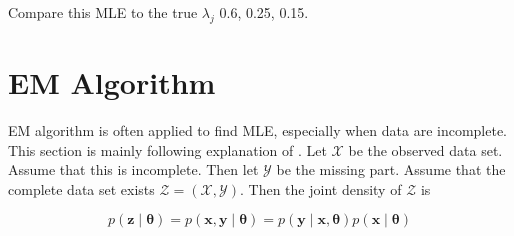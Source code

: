 \documentclass[]{book}
\newenvironment{Shaded}{\begin{snugshade}}{\end{snugshade}}
\newcommand{\CommentTok}[1]{\textcolor[rgb]{0.56,0.35,0.01}{\textit{#1}}}
\newcommand{\DataTypeTok}[1]{\textcolor[rgb]{0.13,0.29,0.53}{#1}}
\newcommand{\DecValTok}[1]{\textcolor[rgb]{0.00,0.00,0.81}{#1}}
\newcommand{\KeywordTok}[1]{\textcolor[rgb]{0.13,0.29,0.53}{\textbf{#1}}}
\newcommand{\NormalTok}[1]{#1}
\newcommand{\OperatorTok}[1]{\textcolor[rgb]{0.81,0.36,0.00}{\textbf{#1}}}
\newcommand{\StringTok}[1]{\textcolor[rgb]{0.31,0.60,0.02}{#1}}
\theoremstyle{definition}
\theoremstyle{definition}
\theoremstyle{definition}
\theoremstyle{remark}
\begin{document}
\begin{Shaded}
\end{Shaded}

Compare this MLE to the true \(\lambda_j\) 0.6, 0.25, 0.15.

\hypertarget{em-algorithm}{%
\section{EM Algorithm}\label{em-algorithm}}

EM algorithm is often applied to find MLE, especially when data are incomplete. This section is mainly following explanation of \citet{Bilmes:1998tg}. Let \(\mathcal{X}\) be the observed data set. Assume that this is incomplete. Then let \(\mathcal{Y}\) be the missing part. Assume that the complete data set exists \(\mathcal{Z} = (\mathcal{X}, \mathcal{Y})\). Then the joint density of \(\mathcal{Z}\) is

\begin{equation}
  p(\mathbf{z} \mid \boldsymbol\theta) = p(\mathbf{x}, \mathbf{y} \mid \boldsymbol\theta) = p(\mathbf{y} \mid \mathbf{x}, \boldsymbol\theta) p(\mathbf{x} \mid \boldsymbol\theta)
  \label{eq:completejoint}
\end{equation}
\end{document}
